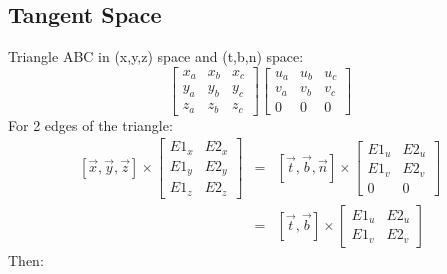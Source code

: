 \documentclass[12pt]{article}
\begin{document}
    \subsection{Tangent Space}
        Triangle ABC in (x,y,z) space and (t,b,n) space:
        \[
            \left[ \begin{array}{ccc}
            x_a & x_b & x_c \\
            y_a & y_b & y_c \\
            z_a & z_b & z_c
            \end{array} \right]
            \left[ \begin{array}{ccc}
            u_a & u_b & u_c \\
            v_a & v_b & v_c \\
            0   & 0   & 0
            \end{array} \right]
        \]
        For 2 edges of the triangle:
        \begin{eqnarray*}
            \left[ \overrightarrow{x}, \overrightarrow{y}, \overrightarrow{z} \right]       
            \times
            \left[ \begin{array}{cc}
                E1_x & E2_x \\
                E1_y & E2_y \\
                E1_z & E2_z
            \end{array} \right]
            & = &
            \left[ \overrightarrow{t}, \overrightarrow{b}, \overrightarrow{n} \right]       
            \times
            \left[ \begin{array}{cc}
                E1_u & E2_u \\
                E1_v & E2_v \\
                0    & 0
            \end{array} \right] \\
            & = &
            \left[ \overrightarrow{t}, \overrightarrow{b} \right]       
            \times
            \left[ \begin{array}{cc}
                E1_u & E2_u \\
                E1_v & E2_v
            \end{array} \right]
        \end{eqnarray*}
        Then:
\end{document}
